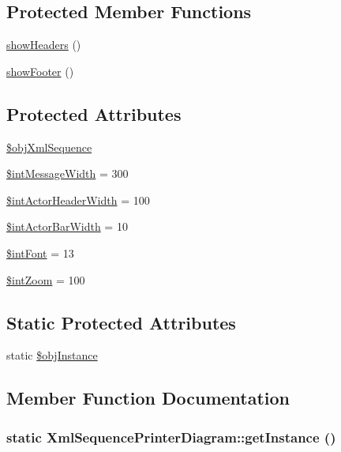 \subsection*{Protected Member Functions}
\begin{CompactItemize}
\item 
\hyperlink{class_xml_sequence_printer_diagram_e7975e1165f4b290bc9ddaba3ae7d5c5}{showHeaders} ()
\item 
\hyperlink{class_xml_sequence_printer_diagram_11f8dd9065dd384aeb6e498578cff669}{showFooter} ()
\end{CompactItemize}
\subsection*{Protected Attributes}
\begin{CompactItemize}
\item 
\hyperlink{class_xml_sequence_printer_diagram_4d24b76a9be3f7a080a5434e5d917912}{\$objXmlSequence}
\item 
\hyperlink{class_xml_sequence_printer_diagram_342c720d4dc17c2b8fd161f3f2579b3a}{\$intMessageWidth} = 300
\item 
\hyperlink{class_xml_sequence_printer_diagram_223b298c0d3af258bfe6a2631ae33ff5}{\$intActorHeaderWidth} = 100
\item 
\hyperlink{class_xml_sequence_printer_diagram_97531ddc90690c05c0feecd57be48006}{\$intActorBarWidth} = 10
\item 
\hyperlink{class_xml_sequence_printer_diagram_dd52069aecd62faf2c555a4dec1ad607}{\$intFont} = 13
\item 
\hyperlink{class_xml_sequence_printer_diagram_6feab15dfe17205a6efca8744c792477}{\$intZoom} = 100
\end{CompactItemize}
\subsection*{Static Protected Attributes}
\begin{CompactItemize}
\item 
static \hyperlink{class_xml_sequence_printer_diagram_bbc670b6771acaff2420cc4feb1624c8}{\$objInstance}
\end{CompactItemize}


\subsection{Member Function Documentation}
\hypertarget{class_xml_sequence_printer_diagram_c11a145d18a480a3fa4d8404f9aa1649}{
\subsubsection[{getInstance}]{\setlength{\rightskip}{0pt plus 5cm}static XmlSequencePrinterDiagram::getInstance ()}}
\label{class_xml_sequence_printer_diagram_c11a145d18a480a3fa4d8404f9aa1649}


